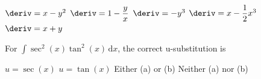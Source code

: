 \begin{questions}
    \begin{oneparchoices}
        \choice $\deriv = x - y^2$
        \choice $\deriv = 1 - \dfrac{y}{x}$
        \choice $\deriv = -y^3$
        \choice $\deriv = x - \dfrac{1}{2}x^3$
        \choice $\deriv = x + y$
    \end{oneparchoices} \par \horizontalline

    \question For $\int \sec^2 (x)\tan^2 (x) \,\mathrm{d}x$, the correct u-substitution is \\

    \begin{oneparchoices}
        \choice $u = \sec (x)$ 
        \choice $u = \tan (x)$
        \choice Either (a) or (b)
        \choice Neither (a) nor (b)
    \end{oneparchoices} \par \horizontalline

    \newpage


\end{questions}

